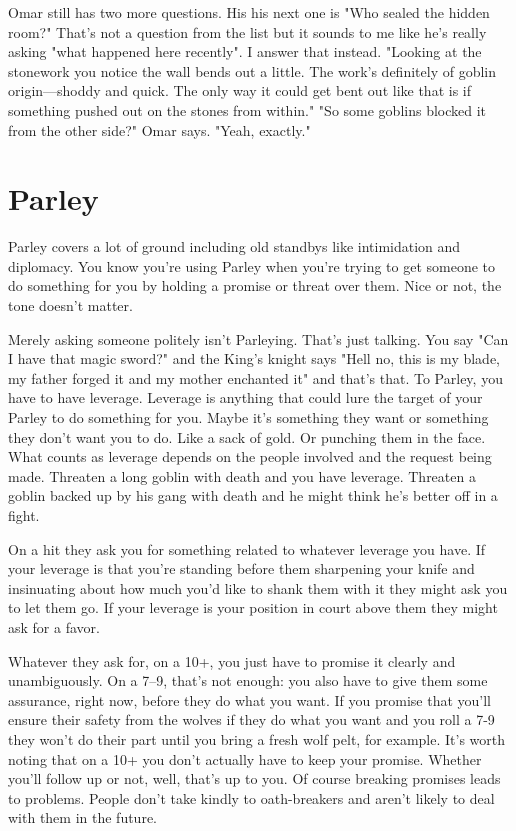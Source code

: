 \startExample
Omar still has two more questions. His his next one is "Who sealed the hidden room?" That's not a question from the list but it sounds to me like he's really asking "what happened here recently". I answer that instead. "Looking at the stonework you notice the wall bends out a little. The work's definitely of goblin origin—shoddy and quick. The only way it could get bent out like that is if something pushed out on the stones from within." "So some goblins blocked it from the other side?" Omar says. "Yeah, exactly."
\stopExample
       
\section{Parley}   
       

Parley covers a lot of ground including old standbys like intimidation and diplomacy. You know you're using Parley when you're trying to get someone to do something for you by holding a promise or threat over them. Nice or not, the tone doesn't matter.

       

Merely asking someone politely isn't Parleying. That's just talking. You say "Can I have that magic sword?" and the King's knight says "Hell no, this is my blade, my father forged it and my mother enchanted it" and that's that. To Parley, you have to have leverage. Leverage is anything that could lure the target of your Parley to do something for you. Maybe it's something they want or something they don't want you to do. Like a sack of gold. Or punching them in the face. What counts as leverage depends on the people involved and the request being made. Threaten a long goblin with death and you have leverage. Threaten a goblin backed up by his gang with death and he might think he's better off in a fight.

       

On a hit they ask you for something related to whatever leverage you have. If your leverage is that you're standing before them sharpening your knife and insinuating about how much you'd like to shank them with it they might ask you to let them go. If your leverage is your position in court above them they might ask for a favor.

       

Whatever they ask for, on a 10+, you just have to promise it clearly and unambiguously. On a 7–9, that's not enough: you also have to give them some assurance, right now, before they do what you want. If you promise that you'll ensure their safety from the wolves if they do what you want and you roll a 7-9 they won't do their part until you bring a fresh wolf pelt, for example. It's worth noting that on a 10+ you don't actually have to keep your promise. Whether you'll follow up or not, well, that's up to you. Of course breaking promises leads to problems. People don't take kindly to oath-breakers and aren't likely to deal with them in the future.

